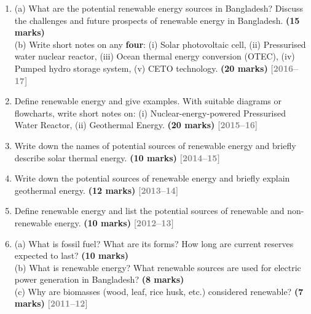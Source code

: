 \documentclass[12pt,a3paper]{article}
\newcommand{\yr}[1]{\hfill\textcolor{gray}{\small\textbf{[#1]}}}
\newcommand{\mk}[1]{\textcolor{orange!70!black}{\small\textbf{(#1 marks)}}}
\begin{document}
\begin{enumerate}
\item \label{qlabel:A1-Q3}
(a) What are the potential renewable energy sources in Bangladesh? Discuss the challenges and future prospects of renewable energy in Bangladesh. \mk{15}\\
(b) Write short notes on any \textbf{four}: (i) Solar photovoltaic cell, (ii) Pressurised water nuclear reactor, (iii) Ocean thermal energy conversion (OTEC), (iv) Pumped hydro storage system, (v) CETO technology. \mk{20}
\yr{2016--17}




\item \label{qlabel:A1-Q14}
Define renewable energy and give examples. With suitable diagrams or flowcharts, write short notes on: (i) Nuclear-energy-powered Pressurised Water Reactor, (ii) Geothermal Energy. \mk{20}
\yr{2015--16}




\item \label{qlabel:A1-Q13}
Write down the names of potential sources of renewable energy and briefly describe solar thermal energy. \mk{10}
\yr{2014--15}




\item \label{qlabel:A1-Q12}
Write down the potential sources of renewable energy and briefly explain geothermal energy. \mk{12}
\yr{2013--14}




\item \label{qlabel:A1-Q8}
Define renewable energy and list the potential sources of renewable and non-renewable energy. \mk{10}
\yr{2012--13}




\item \label{qlabel:A1-Q9}
(a) What is fossil fuel? What are its forms? How long are current reserves expected to last? \mk{10}\\
(b) What is renewable energy? What renewable sources are used for electric power generation in Bangladesh? \mk{8}\\
(c) Why are biomasses (wood, leaf, rice husk, etc.) considered renewable? \mk{7}
\yr{2011--12}





\end{enumerate}
\end{document}
